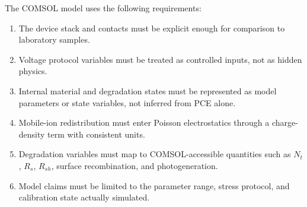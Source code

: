 The COMSOL model uses the following requirements:
\begin{enumerate}
\item The device stack and contacts must be explicit enough for comparison to
laboratory samples.
\item Voltage protocol variables must be treated as controlled inputs, not as
hidden physics.
\item Internal material and degradation states must be represented as model
parameters or state variables, not inferred from PCE alone.
\item Mobile-ion redistribution must enter Poisson electrostatics through a
charge-density term with consistent units.
\item Degradation variables must map to COMSOL-accessible quantities such as
$N_t$, $R_s$, $R_{sh}$, surface recombination, and photogeneration.
\item Model claims must be limited to the parameter range, stress protocol, and
calibration state actually simulated.
\end{enumerate}
